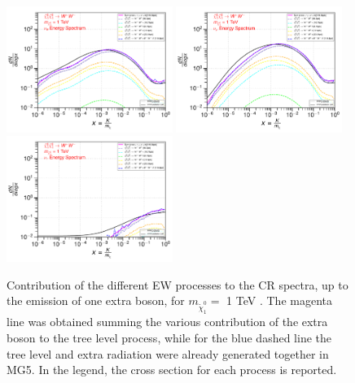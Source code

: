 \documentclass[epj,nopacs,fleqn]{svjour}
\begin{document}
\begin{figure}[!h]
	\subfigure
	{\includegraphics[width=0.48\textwidth]{Fig/n1ww_comparison/1000.0_neutrinos_e_n1ww_comparison_1000.0.pdf} }
	\subfigure
	{\includegraphics[width=0.48\textwidth]{Fig/n1ww_comparison/1000.0_neutrinos_mu_n1ww_comparison_1000.0.pdf} }
	\subfigure
	{\includegraphics[width=0.48\textwidth]{Fig/n1ww_comparison/1000.0_neutrinos_tau_n1ww_comparison_1000.0.pdf} }
	
	\caption{Contribution of the different EW processes to the CR spectra, up to the emission of one extra boson, for $m_{\tilde \chi_1 ^0}=$ 1 TeV . The magenta line was obtained summing the various contribution of the extra boson to the tree level process, while for the blue dashed line the tree level and extra radiation were already generated together in MG5. In the legend, the cross section for each process is reported.}
	\label{ew_comparison_1}
\end{figure}
\end{document}
